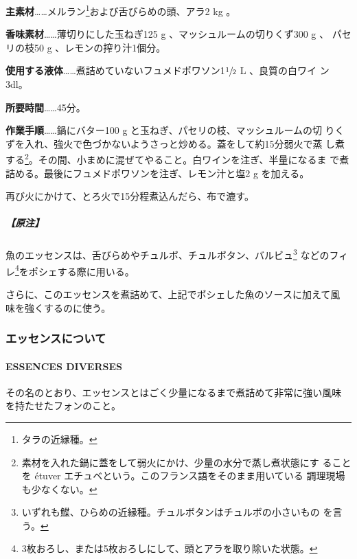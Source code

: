 \documentclass[twoside,12Q,b5j]{escoffierltjsbook}
\newenvironment{recette}{\begin{multicols}{2}}{\end{multicols}}
\begin{document}
\begin{recette}
\textbf{主素材}\ldots{}\ldots{}メルラン\footnote{タラの近縁種。}および舌びらめの頭、アラ2
kg 。

\textbf{香味素材}\ldots{}\ldots{}薄切りにした玉ねぎ125 g
、マッシュルームの切りくず300 g 、 パセリの枝50 g
、レモンの搾り汁1個分。

\textbf{使用する液体}\ldots{}\ldots{}煮詰めていないフュメドポワソン1\(\sfrac{1}{2}\)
L 、良質の白ワイ ン3dl。

\textbf{所要時間}\ldots{}\ldots{}45分。

\textbf{作業手順}\ldots{}\ldots{}鍋にバター100 g
と玉ねぎ、パセリの枝、マッシュルームの切
りくずを入れ、強火で色づかないようさっと炒める。蓋をして約15分弱火で蒸
し煮する\footnote{素材を入れた鍋に蓋をして弱火にかけ、少量の水分で蒸し煮状態にす
  ることを étuver エチュベという。このフランス語をそのまま用いている
  調理現場も少なくない。}。その間、小まめに混ぜてやること。白ワインを注ぎ、半量になるま
で煮詰める。最後にフュメドポワソンを注ぎ、レモン汁と塩2 g を加える。

再び火にかけて、とろ火で15分程煮込んだら、布で漉す。

\subparagraph{【原注】}\label{ux539fux6ce8-4}

魚のエッセンスは、舌びらめやチュルボ、チュルボタン、バルビュ\footnote{いずれも鰈、ひらめの近縁種。チュルボタンはチュルボの小さいもの
  を言う。} などのフィレ\footnote{3枚おろし、または5枚おろしにして、頭とアラを取り除いた状態。}をポシェする際に用いる。

さらに、このエッセンスを煮詰めて、上記でポシェした魚のソースに加えて風
味を強くするのに使う。

\vspace*{2\zw}

\subsubsection{エッセンスについて}\label{ux30a8ux30c3ux30bbux30f3ux30b9ux306bux3064ux3044ux3066}

\paragraph{ESSENCES DIVERSES}\label{essences-diverses}


その名のとおり、エッセンスとはごく少量になるまで煮詰めて非常に強い風味
を持たせたフォンのこと。


\end{recette}
\end{document}
